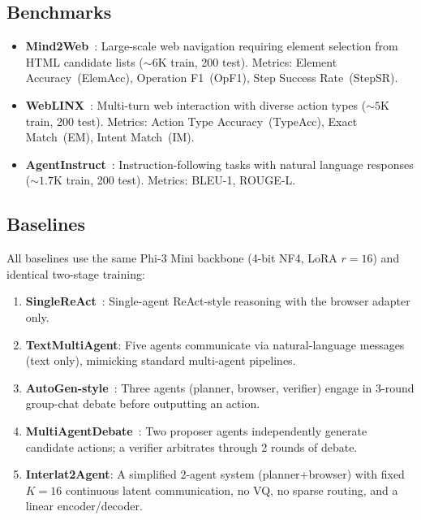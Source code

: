 \documentclass{article}
\begin{document}
\subsection{Benchmarks}
\begin{itemize}[leftmargin=*,itemsep=1pt]
\item \textbf{Mind2Web}~\cite{deng2024mind2web}: Large-scale web navigation requiring element selection from HTML candidate lists (${\sim}6$K train, 200 test).  Metrics: Element Accuracy~(ElemAcc), Operation F1~(OpF1), Step Success Rate~(StepSR).
\item \textbf{WebLINX}~\cite{lu2024weblinx}: Multi-turn web interaction with diverse action types (${\sim}5$K train, 200 test).  Metrics: Action Type Accuracy~(TypeAcc), Exact Match~(EM), Intent Match~(IM).
\item \textbf{AgentInstruct}~\cite{zeng2024agentinstruct}: Instruction-following tasks with natural language responses (${\sim}1.7$K train, 200 test).  Metrics: BLEU-1, ROUGE-L.
\end{itemize}

\subsection{Baselines}
\label{sec:baselines}

All baselines use the same Phi-3 Mini backbone (4-bit NF4, LoRA $r{=}16$) and identical two-stage training:

\begin{enumerate}[leftmargin=*,itemsep=1pt]
\item \textbf{SingleReAct}~\cite{yao2023react}: Single-agent ReAct-style reasoning with the browser adapter only.
\item \textbf{TextMultiAgent}: Five agents communicate via natural-language messages (text only), mimicking standard multi-agent pipelines.
\item \textbf{AutoGen-style}~\cite{wu2023autogen}: Three agents (planner, browser, verifier) engage in 3-round group-chat debate before outputting an action.
\item \textbf{MultiAgentDebate}~\cite{du2023improving}: Two proposer agents independently generate candidate actions; a verifier arbitrates through 2 rounds of debate.
\item \textbf{Interlat2Agent}: A simplified 2-agent system (planner+browser) with fixed $K{=}16$ continuous latent communication, no VQ, no sparse routing, and a linear encoder/decoder.
\end{enumerate}
\end{document}

